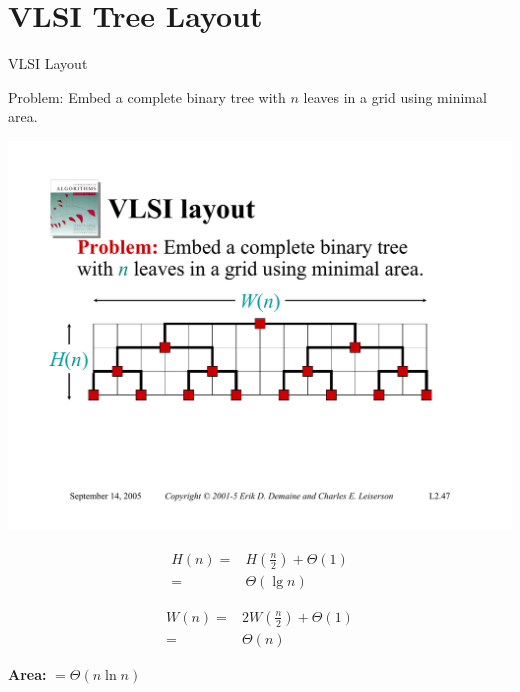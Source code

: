 \documentclass{beamer}
\begin{document}
\section{VLSI Tree Layout}

\begin{frame}{VLSI Layout}
    \begin{exampleblock}{Problem:}
        Embed a complete binary tree with $n$ leaves in a grid using minimal area.
    \end{exampleblock}
    \pause
    \centering
    \includegraphics[width=\textwidth, trim={1cm 5cm 2cm 7cm}, clip]{pages/lec3_47}
    \begin{minipage}{0.48\textwidth}
        \pause
        \begin{equation*}
            \begin{split}
                H(n) =& H\left(\frac{n}{2}\right) + \Theta(1) \\
                    =& \Theta(\lg n)
            \end{split}
        \end{equation*}
    \end{minipage}
    \hfill
    \begin{minipage}{0.48\textwidth}
        \pause
        \begin{equation*}
            \begin{split}
                W(n) =& 2W\left(\frac{n}{2}\right) + \Theta(1) \\
                    =& \Theta(n)
            \end{split}
        \end{equation*}
    \end{minipage}
    \pause
    \begin{exampleblock}{ }
        \centering
        \Large
        \textbf{Area:} $ = \Theta(n \ln n)$
    \end{exampleblock}
\end{frame}
\end{document}

